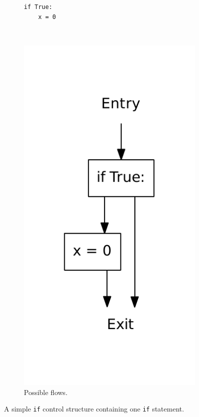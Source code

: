 \begin{figure}
  \centering
  \begin{subfigure}[b]{0.4\textwidth}
    \begin{lstlisting}[style=python, caption={Code example.}, label={python:if:simple:code}]
if True:
    x = 0
    \end{lstlisting}
  \end{subfigure}
  ~ %
  \begin{subfigure}[b]{0.4\textwidth}
    \centering
    \includegraphics[scale=.5]{./figures/if.pdf}
    \caption{Possible flows.}
    \label{python:if:simple:flow}
  \end{subfigure}
  \caption{A simple \texttt{if} control structure containing one \texttt{if} statement.}
  \label{python:if:simple}
\end{figure}

